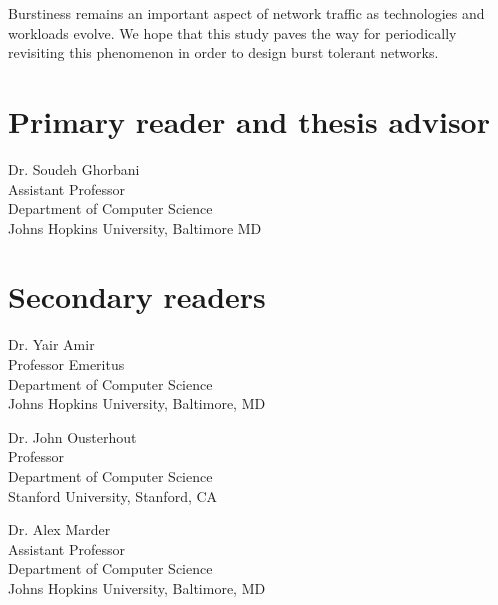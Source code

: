 Burstiness remains an important aspect of network traffic as technologies and workloads evolve. We hope that this study paves the way for periodically revisiting this phenomenon in order to design burst tolerant networks.



\begin{singlespace}

    \section*{Primary reader and thesis advisor}
    
    Dr. Soudeh Ghorbani \\
    Assistant Professor\\
    Department of Computer Science\\
    Johns Hopkins University, Baltimore MD 


    \section*{Secondary readers}
    
    Dr. Yair Amir\\
    Professor Emeritus\\
    Department of Computer Science \\
    Johns Hopkins University, Baltimore, MD 
    
    \vspace{0.1in}
    
    Dr. John Ousterhout \\
    Professor\\
    Department of Computer Science \\
    Stanford University, Stanford, CA 

    \vspace{0.1in}
    
    Dr. Alex Marder \\
    Assistant Professor\\
    Department of Computer Science \\
    Johns Hopkins University, Baltimore, MD 



\end{singlespace}
